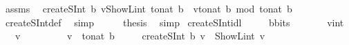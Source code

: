 \begin{isabellebody}
\ assms\ \isamarkupfalse%
\ {\isachardoublequoteopen}createSInt\ b\ v{\isacharequal}{\kern0pt}ShowL\isactrlsub i\isactrlsub n\isactrlsub t\ {\isacharparenleft}{\kern0pt}{\isacharminus}{\kern0pt}{\isacharparenleft}{\kern0pt}{}{\isacharcircum}{\kern0pt}{\isacharparenleft}{\kern0pt}{\isacharparenleft}{\kern0pt}to{\isacharunderscore}{\kern0pt}nat\ b{\isacharparenright}{\kern0pt}{\isacharminus}{\kern0pt}{}{\isacharparenright}{\kern0pt}{\isacharparenright}{\kern0pt}\ {\isacharplus}{\kern0pt}\ {\isacharparenleft}{\kern0pt}v{\isacharplus}{\kern0pt}{}{\isacharcircum}{\kern0pt}{\isacharparenleft}{\kern0pt}{\isacharparenleft}{\kern0pt}to{\isacharunderscore}{\kern0pt}nat\ b{\isacharparenright}{\kern0pt}{\isacharminus}{\kern0pt}{}{\isacharparenright}{\kern0pt}{\isacharparenright}{\kern0pt}\ mod\ {\isacharparenleft}{\kern0pt}{}{\isacharcircum}{\kern0pt}{\isacharparenleft}{\kern0pt}to{\isacharunderscore}{\kern0pt}nat\ b{\isacharparenright}{\kern0pt}{\isacharparenright}{\kern0pt}{\isacharparenright}{\kern0pt}{\isachardoublequoteclose}\ \isamarkupfalse%
\ createSInt{\isacharunderscore}{\kern0pt}def\ \isamarkupfalse%
\ simp\isanewline
\ \ \isamarkupfalse%
\ \isamarkupfalse%
\ {\isacharquery}{\kern0pt}thesis\ \isamarkupfalse%
\ simp\isanewline
{}\isamarkupfalse%
%
\endisatagproof
{\isafoldproof}%
%
\isadelimproof
\isanewline
%
\endisadelimproof
\isanewline
{}\isamarkupfalse%
\ createSInt{\isacharunderscore}{\kern0pt}id{\isacharunderscore}{\kern0pt}l{}{\isacharcolon}{\kern0pt}\isanewline
\ \ \ \ \ b{\isacharcolon}{\kern0pt}{\isacharcolon}{\kern0pt}bits\isanewline
\ \ \ \ \ \ \ v{\isacharcolon}{\kern0pt}{\isacharcolon}{\kern0pt}int\isanewline
\ \ \ {\isachardoublequoteopen}v\ {\isacharless}{\kern0pt}\ {}{\isachardoublequoteclose}\isanewline
\ \ \ \ \ \ \ {\isachardoublequoteopen}v\ {\isasymge}\ {\isacharminus}{\kern0pt}{\isacharparenleft}{\kern0pt}{}{\isacharcircum}{\kern0pt}{\isacharparenleft}{\kern0pt}{\isacharparenleft}{\kern0pt}to{\isacharunderscore}{\kern0pt}nat\ b{\isacharparenright}{\kern0pt}{\isacharminus}{\kern0pt}{}{\isacharparenright}{\kern0pt}{\isacharparenright}{\kern0pt}{\isachardoublequoteclose}\isanewline
\ \ \ \ \ {\isachardoublequoteopen}createSInt\ b\ v\ {\isacharequal}{\kern0pt}\ ShowL\isactrlsub i\isactrlsub n\isactrlsub t\ v{\isachardoublequoteclose}\isanewline

\end{isabellebody}
